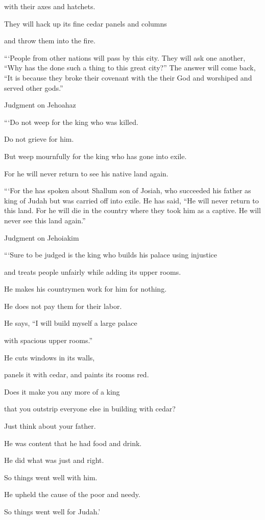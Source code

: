 {\par }{\Q with
their axes and hatchets.
\par }{\Q They will hack up its fine
cedar
panels and columns
\par }{\Q and throw them into
the fire.
\par }{\PP {}“‘People
from other
nations
will pass
by this
city.
They will ask
one
another,
“Why
has
the {}
done
such
a thing to this
great
city?”
The answer
will come back,
“It is because they broke
their covenant
with the
{}
their God
and worshiped
and served
other
gods.”
\par }{\SH Judgment on Jehoahaz
\par }{\Q {}“‘Do not
weep
for the king who was killed.
\par }{\Q Do not
grieve
for him.
\par }{\Q But weep mournfully
for the king who has gone
into exile.
\par }{\Q For
he will never
return
to see
his native
land
again.
\par }{\PP {}“‘For
the {}
has spoken
about
Shallum
son
of Josiah,
who succeeded
his father
as
king
of Judah
but was carried off
into exile. He has said, “He will never
return
to this land.
For
he will die
in the country
where
they took him as
a captive.
He will never
see
this
land
again.”
\par }{\SH Judgment on Jehoiakim
\par }{\Q {}“‘Sure
to be judged
is the king who
builds
his palace
using injustice
\par }{\Q and treats
people unfairly
while
adding
its upper
rooms.

\par }{\Q He makes his
countrymen work
for him for nothing.
\par }{\Q He does not
pay them for their labor.
\par }{\Q {}He says,
“I will build
myself a large palace
\par }{\Q with spacious
upper
rooms.”
\par }{\Q He cuts
windows
in its walls,
\par }{\Q panels it with
cedar,
and paints
its rooms red.
\par }{\Q {}Does it make you any more of a king
\par }{\Q that
you
outstrip
everyone else in building with cedar?
\par }{\Q Just think about your father.
\par }{\Q He was content that he had food
and drink.
\par }{\Q He did
what was just and right.
\par }{\Q So
things went well with him.
\par }{\Q {}He upheld
the cause
of the poor
and needy.
\par }{\Q So things went well for Judah.’

}
